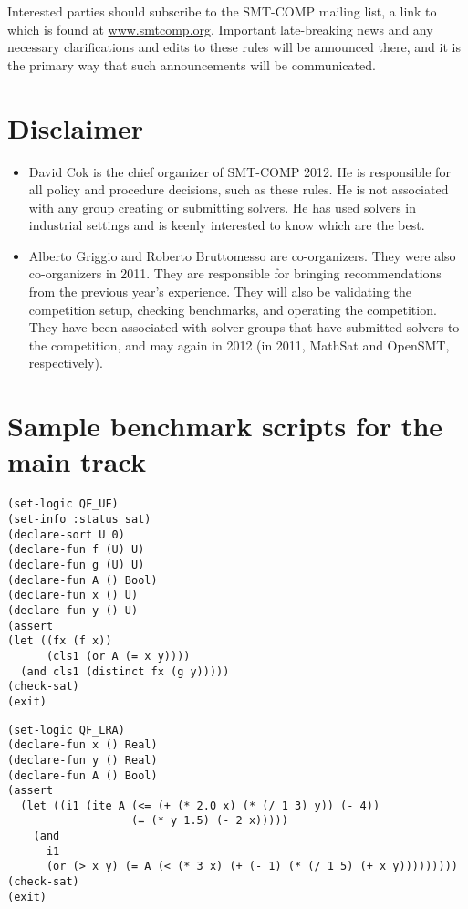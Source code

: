 \documentclass[12pt]{article}
\begin{document}
Interested parties should subscribe to the SMT-COMP mailing list, a
link to which is found at \url{www.smtcomp.org}.  Important
late-breaking news and any necessary clarifications and edits to these
rules will be announced there, and it is the primary way that such
announcements will be communicated.

\section{Disclaimer}
\begin{itemize}
\item David Cok is the chief organizer of SMT-COMP 2012. He is 
responsible for all policy and procedure decisions, such as these
rules. He is not associated 
with any group creating or submitting solvers. He has used solvers
in industrial settings and is keenly interested to know which are the best.

\item Alberto Griggio and Roberto Bruttomesso are co-organizers. They 
were also co-organizers in 2011. They are responsible for bringing 
recommendations from the previous year's experience. They will also 
be validating the competition setup, checking benchmarks, and
operating the competition. They have been associated with solver groups
that have submitted solvers to the competition, and may again in 2012 (in 2011, 
MathSat and OpenSMT, respectively).
\end{itemize}



\appendix
\section{Sample benchmark scripts for the main track}


{\footnotesize
\begin{verbatim}
(set-logic QF_UF)
(set-info :status sat)
(declare-sort U 0)
(declare-fun f (U) U)
(declare-fun g (U) U)
(declare-fun A () Bool)
(declare-fun x () U)
(declare-fun y () U)
(assert
(let ((fx (f x))
      (cls1 (or A (= x y))))
  (and cls1 (distinct fx (g y)))))
(check-sat)
(exit)
\end{verbatim}}



{\footnotesize
\begin{verbatim}
(set-logic QF_LRA)
(declare-fun x () Real)
(declare-fun y () Real)
(declare-fun A () Bool)
(assert
  (let ((i1 (ite A (<= (+ (* 2.0 x) (* (/ 1 3) y)) (- 4))
                   (= (* y 1.5) (- 2 x)))))
    (and
      i1
      (or (> x y) (= A (< (* 3 x) (+ (- 1) (* (/ 1 5) (+ x y)))))))))
(check-sat)
(exit)
\end{verbatim}}
\end{document}
